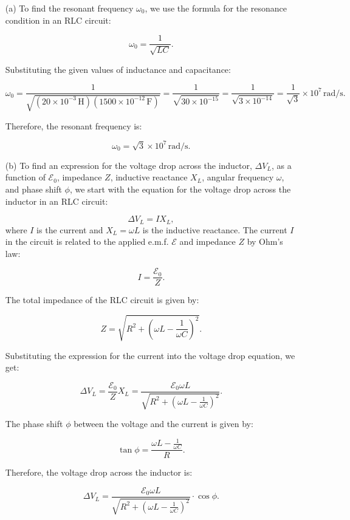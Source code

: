 \begin{enumerate}
    \item[(a)] To find the resonant frequency $\omega_0$, we use the formula for the resonance condition in an RLC circuit:

    \[
    \omega_0 = \frac{1}{\sqrt{LC}}.
    \]

    Substituting the given values of inductance and capacitance:

    \[
    \omega_0 = \frac{1}{\sqrt{(20 \times 10^{-3} \, \mathrm{H})(1500 \times 10^{-12} \, \mathrm{F})}} = \frac{1}{\sqrt{30 \times 10^{-15}}} = \frac{1}{\sqrt{3 \times 10^{-14}}} = \frac{1}{\sqrt{3}} \times 10^7 \, \mathrm{rad/s}.
    \]

    Therefore, the resonant frequency is:

    \[
    \omega_0 = \sqrt{3} \times 10^7 \, \mathrm{rad/s}.
    \]

    \item[(b)] To find an expression for the voltage drop across the inductor, $\Delta V_L$, as a function of $\mathcal{E}_0$, impedance $Z$, inductive reactance $X_L$, angular frequency $\omega$, and phase shift $\phi$, we start with the equation for the voltage drop across the inductor in an RLC circuit:

    \[
    \Delta V_L = I X_L,
    \]
    where $I$ is the current and $X_L = \omega L$ is the inductive reactance. The current $I$ in the circuit is related to the applied e.m.f. $\mathcal{E}$ and impedance $Z$ by Ohm's law:

    \[
    I = \frac{\mathcal{E}_0}{Z}.
    \]

    The total impedance of the RLC circuit is given by:

    \[
    Z = \sqrt{R^2 + (\omega L - \frac{1}{\omega C})^2}.
    \]

    Substituting the expression for the current into the voltage drop equation, we get:

    \[
    \Delta V_L = \frac{\mathcal{E}_0}{Z} X_L = \frac{\mathcal{E}_0 \omega L}{\sqrt{R^2 + (\omega L - \frac{1}{\omega C})^2}}.
    \]

    The phase shift $\phi$ between the voltage and the current is given by:

    \[
    \tan \phi = \frac{\omega L - \frac{1}{\omega C}}{R}.
    \]

    Therefore, the voltage drop across the inductor is:

    \[
    \Delta V_L = \frac{\mathcal{E}_0 \omega L}{\sqrt{R^2 + (\omega L - \frac{1}{\omega C})^2}} \cdot \cos \phi.
    \]


\end{enumerate}
